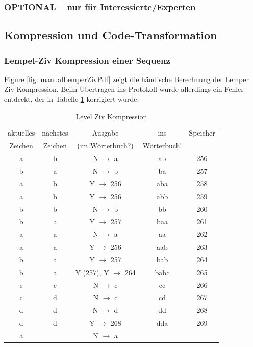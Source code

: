 \documentclass[12pt,german]{article}
\begin{document}
\newpage

\label{fig: calculateMatrixOctaveCode}


\subsubsection{OPTIONAL – nur für Interessierte/Experten}


\subsection{Kompression und Code-Transformation}
\subsubsection{Lempel-Ziv Kompression einer Sequenz}
Figure \ref{fig: manualLemperZivPdf} zeigt die händische Berechnung der Lemper Ziv Kompression. Beim Übertragen ins Protokoll wurde allerdings ein Fehler entdeckt, der in Tabelle \ref{tab:Level Ziv Kompression} korrigiert wurde.




\label{fig: manualLemperZivPdf}


\begin{table}[H]
  \centering
  \begin{tabular}{c | c | c | c | c |}
    \hline
   	aktuelles  & nächstes  & Ausgabe  & ins & Speicher \\
   	 Zeichen &  Zeichen &  (im Wörterbuch?) & Wörterbuch! &  \\
	a & b & N $ \rightarrow $ a & ab & 256 \\
	b & a & N $ \rightarrow $ b & ba & 257 \\
	a & b & Y $ \rightarrow $ 256 & aba & 258 \\
	a & b & Y $ \rightarrow $ 256 & abb & 259 \\
	b & b & N $ \rightarrow $ b & bb & 260 \\
	b & a & Y $ \rightarrow $ 257 & baa & 261 \\
	a & a & N $ \rightarrow $ a & aa & 262 \\
	a & a & Y $ \rightarrow $ 256 & aab & 263 \\
	b & a & Y $ \rightarrow $ 257 & bab & 264 \\
	b & a & Y (257), Y $ \rightarrow $ 264 & babc & 265 \\
	c & c & N $ \rightarrow $ c & cc & 266 \\
	c & d & N $ \rightarrow $ c & cd & 267 \\
	d & d & N $ \rightarrow $ d & dd & 268 \\
	d & d & Y $ \rightarrow $ 268 & dda & 269 \\
	a &   & N $ \rightarrow $ a &     &   \\ 
   	
  \end{tabular}
  \caption{Level Ziv Kompression}
  \label{tab:Level Ziv Kompression}
\end{table}
\end{document}
